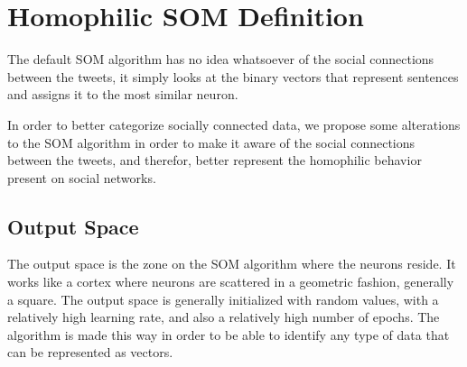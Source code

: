 \section{Homophilic SOM Definition}
\label{sec:algorithm_changes}
The default \ac{SOM} algorithm has no idea whatsoever of the social connections between the tweets, it simply looks at the binary vectors that represent sentences and assigns it to the most similar neuron.

In order to better categorize socially connected data, we propose some alterations to the \ac{SOM} algorithm in order to make it aware of the social connections between the tweets, and therefor, better represent the homophilic behavior present on social networks.

\subsection{Output Space}
\label{sub:output_space}
The output space is the zone on the \ac{SOM} algorithm where the neurons reside. It works like a cortex where neurons are scattered in a geometric fashion, generally a square. The output space is generally initialized with random values, with a relatively high learning rate, and also a relatively high number of epochs. The algorithm is made this way in order to be able to identify any type of data that can be represented as vectors.

